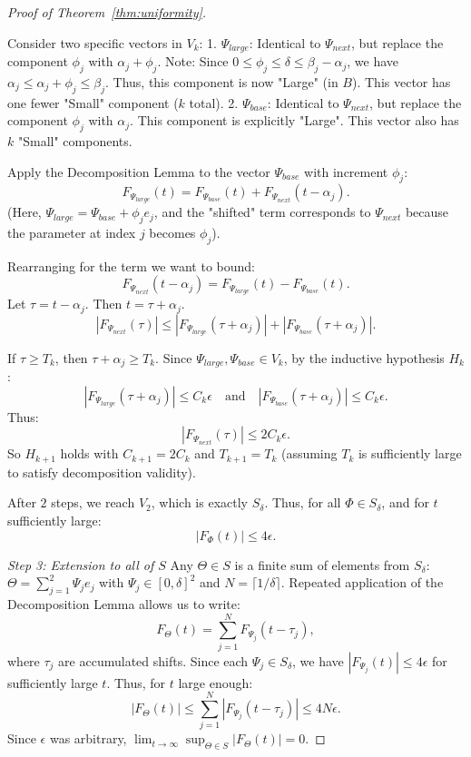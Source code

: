 \documentclass[10pt,reqno]{amsart}
\theoremstyle{definition}
\begin{document}
\begin{proof}[Proof of Theorem~\ref{thm:uniformity}]
\begin{itemize}
		Consider two specific vectors in $V_k$:
		1.  $\Psi_{large}$: Identical to $\Psi_{next}$, but replace the component $\phi_j$ with $\alpha_j + \phi_j$.
		Note: Since $0 \le \phi_j \le \delta \le \beta_j - \alpha_j$, we have $\alpha_j \le \alpha_j + \phi_j \le \beta_j$. Thus, this component is now "Large" (in $B$). This vector has one fewer "Small" component ($k$ total).
		2.  $\Psi_{base}$: Identical to $\Psi_{next}$, but replace the component $\phi_j$ with $\alpha_j$. This component is explicitly "Large". This vector also has $k$ "Small" components.
		
		Apply the Decomposition Lemma to the vector $\Psi_{base}$ with increment $\phi_j$:
		\[ F_{\Psi_{large}}(t) = F_{\Psi_{base}}(t) + F_{\Psi_{next}}(t - \alpha_j). \]
		(Here, $\Psi_{large} = \Psi_{base} + \phi_j e_j$, and the "shifted" term corresponds to $\Psi_{next}$ because the parameter at index $j$ becomes $\phi_j$).
		
		Rearranging for the term we want to bound:
		\[ F_{\Psi_{next}}(t - \alpha_j) = F_{\Psi_{large}}(t) - F_{\Psi_{base}}(t). \]
		Let $\tau = t - \alpha_j$. Then $t = \tau + \alpha_j$.
		\[ |F_{\Psi_{next}}(\tau)| \le |F_{\Psi_{large}}(\tau + \alpha_j)| + |F_{\Psi_{base}}(\tau + \alpha_j)|. \]
		
		If $\tau \ge T_k$, then $\tau + \alpha_j \ge T_k$.
		Since $\Psi_{large}, \Psi_{base} \in V_k$, by the inductive hypothesis $H_k$:
		\[ |F_{\Psi_{large}}(\tau + \alpha_j)| \le C_k \epsilon \quad \text{and} \quad |F_{\Psi_{base}}(\tau + \alpha_j)| \le C_k \epsilon. \]
		Thus:
		\[ |F_{\Psi_{next}}(\tau)| \le 2 C_k \epsilon. \]
		So $H_{k+1}$ holds with $C_{k+1} = 2 C_k$ and $T_{k+1} = T_k$ (assuming $T_k$ is sufficiently large to satisfy decomposition validity).
	\end{itemize}
	
	After $2$ steps, we reach $V_2$, which is exactly $S_\delta$. Thus, for all $\Phi \in S_\delta$, and for $t$ sufficiently large:
	\[ |F_\Phi(t)| \le 4 \epsilon. \]
	
	\textit{Step 3: Extension to all of $S$}
	Any $\Theta \in S$ is a finite sum of elements from $S_\delta$: $\Theta = \sum_{j=1}^2 \Psi_j e_j$ with $\Psi_j \in [0, \delta]^2$ and $N = \lceil 1/\delta \rceil$.
	Repeated application of the Decomposition Lemma allows us to write:
	\[
	F_\Theta(t) = \sum_{j=1}^N F_{\Psi_j}(t - \tau_j),
	\]
	where $\tau_j$ are accumulated shifts. Since each $\Psi_j \in S_\delta$, we have $|F_{\Psi_j}(t)| \le 4 \epsilon$ for sufficiently large $t$.
	Thus, for $t$ large enough:
	\[ |F_\Theta(t)| \le \sum_{j=1}^N |F_{\Psi_j}(t - \tau_j)| \le 4N  \epsilon. \]
	Since $\epsilon$ was arbitrary, $\lim_{t \to \infty} \sup_{\Theta \in S} |F_\Theta(t)| = 0$.
\end{proof}
\end{document}

